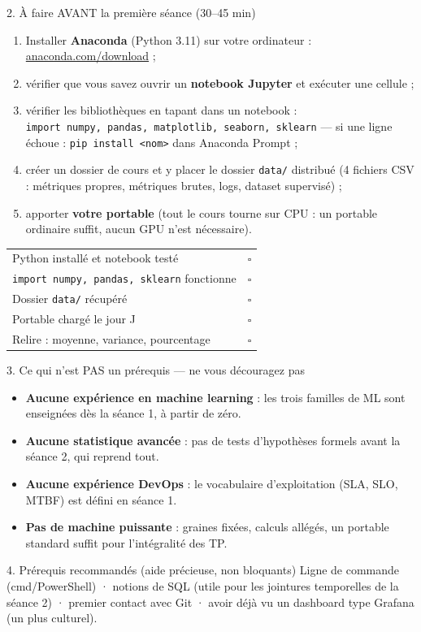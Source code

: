 \documentclass[11pt,a4paper]{article}
\begin{document}
\vspace{2mm}
\begin{abox}{2. À faire AVANT la première séance (30--45 min)}
\begin{enumerate}
\item Installer \textbf{Anaconda} (Python 3.11) sur votre ordinateur :
\href{https://www.anaconda.com/download}{anaconda.com/download} ;
\item vérifier que vous savez ouvrir un \textbf{notebook Jupyter} et exécuter une cellule ;
\item vérifier les bibliothèques en tapant dans un notebook :\\
\texttt{import numpy, pandas, matplotlib, seaborn, sklearn} --- si une ligne échoue :
\texttt{pip install <nom>} dans Anaconda Prompt ;
\item créer un dossier de cours et y placer le dossier \texttt{data/} distribué
(4 fichiers CSV : métriques propres, métriques brutes, logs, dataset supervisé) ;
\item apporter \textbf{votre portable} (tout le cours tourne sur CPU : un portable
ordinaire suffit, aucun GPU n'est nécessaire).
\end{enumerate}
\end{abox}

\vspace{2mm}
\begin{cbox}
\small
\begin{tabular}{@{}p{12.6cm}l@{}}
Python installé et notebook testé & $\square$\\
\texttt{import numpy, pandas, sklearn} fonctionne & $\square$\\
Dossier \texttt{data/} récupéré & $\square$\\
Portable chargé le jour J & $\square$\\
Relire : moyenne, variance, pourcentage & $\square$\\
\end{tabular}
\end{cbox}

\vspace{2mm}
\begin{rbox}{3. Ce qui n'est PAS un prérequis --- ne vous découragez pas}
\begin{itemize}
\item \textbf{Aucune expérience en machine learning} : les trois familles de ML
sont enseignées dès la séance 1, à partir de zéro.
\item \textbf{Aucune statistique avancée} : pas de tests d'hypothèses formels
avant la séance 2, qui reprend tout.
\item \textbf{Aucune expérience DevOps} : le vocabulaire d'exploitation
(SLA, SLO, MTBF) est défini en séance 1.
\item \textbf{Pas de machine puissante} : graines fixées, calculs allégés,
un portable standard suffit pour l'intégralité des TP.
\end{itemize}
\end{rbox}

\vspace{2mm}
\begin{pbox}{4. Prérequis recommandés (aide précieuse, non bloquants)}
Ligne de commande (cmd/PowerShell) · notions de SQL (utile pour les jointures
temporelles de la séance 2) · premier contact avec Git · avoir déjà vu un
dashboard type Grafana (un plus culturel).
\end{pbox}
\end{document}
